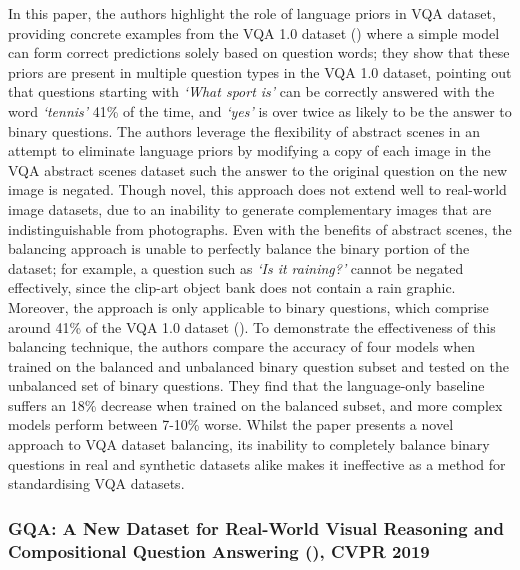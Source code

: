 In this paper, the authors highlight the role of language priors in VQA dataset, providing concrete examples from the VQA 1.0 dataset (\cite{antol2015vqa}) where a simple model can form correct predictions solely based on question words; they show that these priors are present in multiple question types in the VQA 1.0 dataset, pointing out that questions starting with \textit{`What sport is'} can be correctly answered with the word \textit{`tennis'} 41\% of the time, and \textit{`yes'} is over twice as likely to be the answer to binary questions. The authors leverage the flexibility of abstract scenes in an attempt to eliminate language priors by modifying a copy of each image in the VQA abstract scenes dataset such the answer to the original question on the new image is negated. Though novel, this approach does not extend well to real-world image datasets, due to an inability to generate complementary images that are indistinguishable from photographs. Even with the benefits of abstract scenes, the balancing approach is unable to perfectly balance the binary portion of the dataset; for example, a question such as \textit{`Is it raining?'} cannot be negated effectively, since the clip-art object bank does not contain a rain graphic. Moreover, the approach is only applicable to binary questions, which comprise around 41\% of the VQA 1.0 dataset (\cite{antol2015vqa}). To demonstrate the effectiveness of this balancing technique, the authors compare the accuracy of four models when trained on the balanced and unbalanced binary question subset and tested on the unbalanced set of binary questions. They find that the language-only baseline suffers an 18\% decrease when trained on the balanced subset, and more complex models perform between 7-10\% worse. Whilst the paper presents a novel approach to VQA dataset balancing, its inability to completely balance binary questions in real and synthetic datasets alike makes it ineffective as a method for standardising VQA datasets.





\subsubsection*{GQA: A New Dataset for Real-World Visual Reasoning and Compositional Question Answering (\cite{hudson2019gqa}), CVPR 2019}

